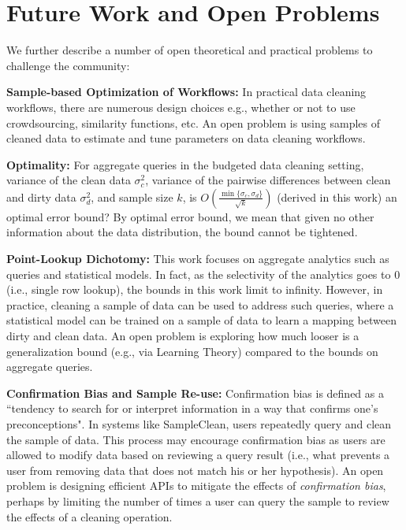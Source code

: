 \section{Future Work and Open Problems}
We further describe a number of open theoretical and practical problems to challenge the community:

\vspace{0.5em}
\noindent \textbf{Sample-based Optimization of Workflows: } In practical data cleaning workflows, there are numerous design choices e.g., whether or not to use crowdsourcing, similarity functions, etc. An open problem is using samples of cleaned data to estimate and tune parameters on data cleaning workflows.

\vspace{0.5em}
\noindent \textbf{Optimality: }For aggregate queries in the budgeted data cleaning setting,
variance of the clean data $\sigma_c^2$, variance of the pairwise differences between clean and dirty data $\sigma_d^2$, and sample size $k$, is $O(\frac{\min \{\sigma_c,\sigma_d\}}{\sqrt{k}})$ (derived in this work) an optimal error bound? By optimal error bound, we mean that given no other information about the data distribution, the bound cannot be tightened.

\vspace{0.5em}
\noindent \textbf{Point-Lookup Dichotomy: } This work focuses on aggregate analytics such as queries and statistical models. In fact, as the selectivity of the analytics goes to 0 (i.e., single row lookup), the bounds in this work limit to infinity. However, in practice, cleaning a sample of data can be used to address such queries, where a statistical model can be trained on a sample of data to learn a mapping between dirty and clean data. An open problem is exploring how much looser is a generalization bound (e.g., via Learning Theory) compared to the bounds on aggregate queries.

\vspace{0.5em}
\noindent \textbf{Confirmation Bias and Sample Re-use: } Confirmation bias is defined as a ``tendency to search for or interpret information in a way that confirms one's preconceptions"\cite{plous1993psychology}. In systems like SampleClean, users repeatedly query and clean the sample of data. This process may encourage confirmation bias as users are allowed to modify data based on reviewing a query result (i.e., what prevents a user from removing data that does not match his or her hypothesis). An open problem is designing efficient APIs to mitigate the effects of \emph{confirmation bias}, perhaps by limiting the number of times a user can query the sample to review the effects of a cleaning operation.


